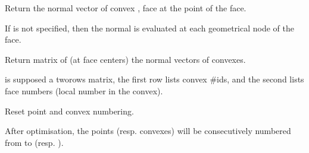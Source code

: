 \documentclass[a4paper,11pt,english]{sphinxmanual}
\begin{document}
\begin{fulllineitems}
\begin{fulllineitems}
\end{fulllineitems}


\begin{fulllineitems}
\label{\detokenize{python/cmdref_Mesh:getfem.Mesh.normal_of_face}}
Return the normal vector of convex , face  at the  point of the face.

If  is not specified, then the normal is evaluated at each
geometrical node of the face.

\end{fulllineitems}


\begin{fulllineitems}
\label{\detokenize{python/cmdref_Mesh:getfem.Mesh.normal_of_faces}}
Return matrix of (at face centers) the normal vectors of convexes.

 is supposed a two\sphinxhyphen{}rows matrix, the first row lists convex
\#ids, and the second lists face numbers (local number in the convex).

\end{fulllineitems}


\begin{fulllineitems}
\label{\detokenize{python/cmdref_Mesh:getfem.Mesh.optimize_structure}}
Reset point and convex numbering.

After optimisation, the points (resp. convexes) will
be consecutively numbered from  to
 (resp. ).

\end{fulllineitems}


\end{fulllineitems}
\end{document}
